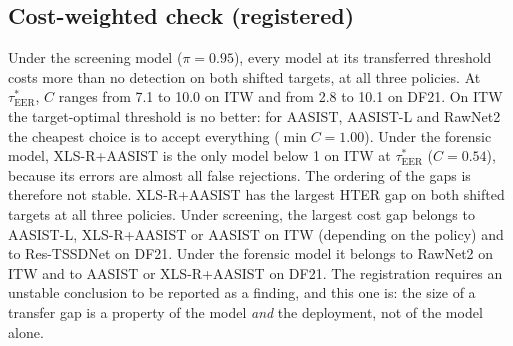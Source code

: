 \documentclass[conference]{IEEEtran}
\newcommand{\tauE}{\tau^{*}_{\mathrm{EER}}}
\begin{document}
\subsection{Cost-weighted check (registered)}
Under the screening model (\(\pi=0.95\)), every model at its transferred
threshold costs more than no detection on both shifted targets, at all three
policies. At \(\tauE\), \(C\) ranges from 7.1 to 10.0 on ITW and from 2.8 to
10.1 on DF21. On ITW the target-optimal threshold is no better: for AASIST,
AASIST-L and RawNet2 the cheapest choice is to accept everything (\(\min C=1.00\)).
Under the forensic model, XLS-R+AASIST is the only model below 1 on ITW at
\(\tauE\) (\(C=0.54\)), because its errors are almost all false rejections. The
ordering of the gaps is therefore not stable. XLS-R+AASIST has the largest HTER
gap on both shifted targets at all three policies. Under screening, the largest
cost gap belongs to AASIST-L, XLS-R+AASIST or AASIST on ITW (depending on the
policy) and to Res-TSSDNet on DF21. Under the forensic model it belongs to
RawNet2 on ITW and to AASIST or XLS-R+AASIST on DF21. The registration requires
an unstable conclusion to be reported as a finding, and this one is: the size of
a transfer gap is a property of the model \emph{and} the deployment, not of the
model alone.

\end{document}
